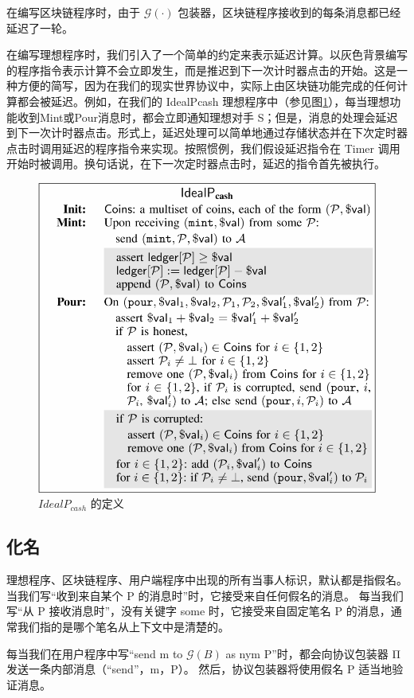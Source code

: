 \documentclass{xduugtrans}
\begin{document}
在编写区块链程序时，由于 $\mathcal{G} ( \cdot )$ 包装器，区块链程序接收到的每条消息都已经延迟了一轮。

在编写理想程序时，我们引入了一个简单的约定来表示延迟计算。以灰色背景编写的程序指令表示计算不会立即发生，而是推迟到下一次计时器点击的开始。这是一种方便的简写，因为在我们的现实世界协议中，实际上由区块链功能完成的任何计算都会被延迟。例如，在我们的 IdealPcash 理想程序中（参见图\ref{fig3}），每当理想功能收到Mint或Pour消息时，都会立即通知理想对手 S；但是，消息的处理会延迟到下一次计时器点击。形式上，延迟处理可以简单地通过存储状态并在下次定时器点击时调用延迟的程序指令来实现。按照惯例，我们假设延迟指令在 Timer 调用开始时被调用。换句话说，在下一次定时器点击时，延迟的指令首先被执行。

\begin{figure}
    \centering
    \includegraphics[width=.8\linewidth]{3}
    \caption{$IdealP_{cash}$ 的定义}
    \label{fig3}
\end{figure}

\subsection{化名}

理想程序、区块链程序、用户端程序中出现的所有当事人标识，默认都是指假名。 当我们写“收到来自某个 P 的消息时”时，它接受来自任何假名的消息。 每当我们写“从 P 接收消息时”，没有关键字 some 时，它接受来自固定笔名 P 的消息，通常我们指的是哪个笔名从上下文中是清楚的。

每当我们在用户程序中写“send m to $\mathcal{G} ( B )$ as nym P”时，都会向协议包装器 Π 发送一条内部消息（“send”，m，P）。 然后，协议包装器将使用假名 P 适当地验证消息。
\end{document}
